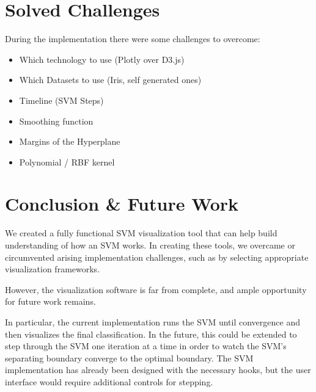 \documentclass{scrartcl}
\begin{document}





\section{Solved Challenges}

During the implementation there were some challenges to overcome:

\begin{itemize}
	\item Which technology to use (Plotly over D3.js)
	\item Which Datasets to use (Iris, self generated ones)
	\item Timeline (SVM Steps) 
	\item Smoothing function
	\item Margins of the Hyperplane
	\item Polynomial / RBF kernel 
\end{itemize}




\section{Conclusion \& Future Work}

We created a fully functional SVM visualization tool
that can help build understanding of how an SVM works.
In creating these tools, we overcame or circumvented arising implementation challenges,
such as by selecting appropriate visualization frameworks.

However, the visualization software is far from complete,
and ample opportunity for future work remains.

In particular, the current implementation runs the SVM until convergence
and then visualizes the final classification.
In the future, this could be extended
to step through the SVM one iteration at a time
in order to watch the SVM's separating boundary converge to the optimal boundary.
The SVM implementation has already been designed with the necessary hooks,
but the user interface would require additional controls for stepping.
\end{document}

